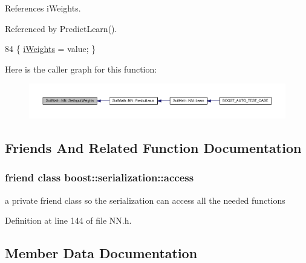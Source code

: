 References i\+Weights.



Referenced by Predict\+Learn().


\begin{DoxyCode}
84 \{ \hyperlink{class_soil_math_1_1_n_n_a96b0fe3caeed3d285204a6b4506075c9}{iWeights} = value; \}
\end{DoxyCode}


Here is the caller graph for this function\+:\nopagebreak
\begin{figure}[H]
\begin{center}
\leavevmode
\includegraphics[width=350pt]{class_soil_math_1_1_n_n_a411371d8297e9d1ff10c919d1293d80e_icgraph}
\end{center}
\end{figure}




\subsection{Friends And Related Function Documentation}
\hypertarget{class_soil_math_1_1_n_n_ac98d07dd8f7b70e16ccb9a01abf56b9c}{}
\subsubsection[{boost\+::serialization\+::access}]{\setlength{\rightskip}{0pt plus 5cm}friend class boost\+::serialization\+::access\hspace{0.3cm}{\ttfamily [friend]}}\label{class_soil_math_1_1_n_n_ac98d07dd8f7b70e16ccb9a01abf56b9c}
a private friend class so the serialization can access all the needed functions 

Definition at line 144 of file N\+N.\+h.



\subsection{Member Data Documentation}
\hypertarget{class_soil_math_1_1_n_n_a4bb773955d78fa6f064b39a9149b78c8}{}
